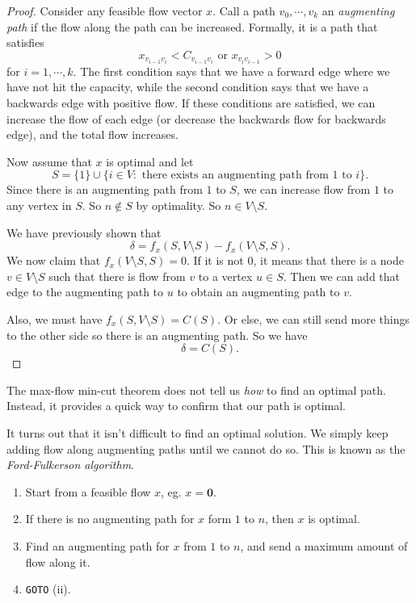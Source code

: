 \documentclass[a4paper]{article}
\begin{document}
\begin{proof}
  Consider any feasible flow vector $x$. Call a path $v_0, \cdots, v_k$ an \emph{augmenting path} if the flow along the path can be increased. Formally, it is a path that satisfies
  \[
    x_{v_{i - 1}v_i} < C_{v_{i - 1}v_i}\text{ or }x_{v_iv_{i - 1}} > 0
  \]
  for $i = 1,\cdots, k$. The first condition says that we have a forward edge where we have not hit the capacity, while the second condition says that we have a backwards edge with positive flow. If these conditions are satisfied, we can increase the flow of each edge (or decrease the backwards flow for backwards edge), and the total flow increases.

  Now assume that $x$ is optimal and let
  \[
    S = \{1\}\cup \{i\in V: \text{ there exists an augmenting path from $1$ to $i$}\}.
  \]
  Since there is an augmenting path from $1$ to $S$, we can increase flow from $1$ to any vertex in $S$. So $n \not\in S$ by optimality. So $n\in V\setminus S$.

  We have previously shown that
  \[
    \delta = f_x(S, V\setminus S) - f_x(V\setminus S, S).
  \]
  We now claim that $f_x(V\setminus S, S) = 0$. If it is not $0$, it means that there is a node $v\in V\setminus S$ such that there is flow from $v$ to a vertex $u\in S$. Then we can add that edge to the augmenting path to $u$ to obtain an augmenting path to $v$.

  Also, we must have $f_x(S, V\setminus S) = C(S)$. Or else, we can still send more things to the other side so there is an augmenting path. So we have
  \[
    \delta = C(S).
  \]
\end{proof}

The max-flow min-cut theorem does not tell us \emph{how} to find an optimal path. Instead, it provides a quick way to confirm that our path is optimal.

It turns out that it isn't difficult to find an optimal solution. We simply keep adding flow along augmenting paths until we cannot do so. This is known as the \emph{Ford-Fulkerson algorithm}.

\begin{enumerate}
  \item Start from a feasible flow $x$, eg. $x = \mathbf{0}$.
  \item If there is no augmenting path for $x$ form $1$ to $n$, then $x$ is optimal.
  \item Find an augmenting path for $x$ from $1$ to $n$, and send a maximum amount of flow along it.
  \item \texttt{GOTO} (ii).
\end{enumerate}
\end{document}
